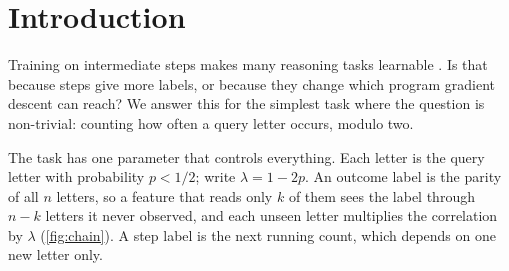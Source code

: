 \begin{abstract}
A Transformer can contain an exact program for counting the letters of a prompt, both one that
writes only the final count and one that writes every running count. We ask which of these programs
gradient training actually finds, and prove three results for counting with $n$ hidden updates.
(1)~\emph{Outcome supervision is hard:} near small initialization, every Transformer term that reads
few letters gets gradient signal of order $\lambda^n$, where $\lambda<1$ is set by the letter
frequency, and outcome training stays on a plateau for time $\lambda^{-n}$.
(2)~\emph{Step supervision is easy:} displayed running counts keep a gradient signal that decays
only polynomially in $n$, joint gradient flow learns each transition in time $O(\varepsilon^{-4}\log\frac1\varepsilon)$, and step
training learns attention routing from zero position biases in polynomial time.
(3)~\emph{Same family, opposite outcomes:} in a model family that contains exact executors for both
formats, step gradient flow reaches positive margins on every transition from every seed in an explicit open set,
while outcome gradient flow from the same seeds converges to a suboptimal minimum with accuracy
$(1+\lambda^{n-1})/2$.
Experiments confirm the $\lambda^{-n}$ plateau and the trap, and show that step training learns routing jointly.
\end{abstract}

\section{Introduction}
\label{sec:intro}

Training on intermediate steps makes many reasoning tasks learnable
\citep{nye2021scratchpads,wei2022cot,lightman2023verify}. Is that because steps give more labels,
or because they change which program gradient descent can reach? We answer this for the simplest
task where the question is non-trivial: counting how often a query letter occurs, modulo two.

The task has one parameter that controls everything. Each letter is the query letter with
probability $p<1/2$; write $\lambda=1-2p$. An outcome label is the parity of all $n$ letters, so a
feature that reads only $k$ of them sees the label through $n-k$ letters it never observed, and each
unseen letter multiplies the correlation by $\lambda$ (\cref{fig:chain}). A step label is the next
running count, which depends on one new letter only.

